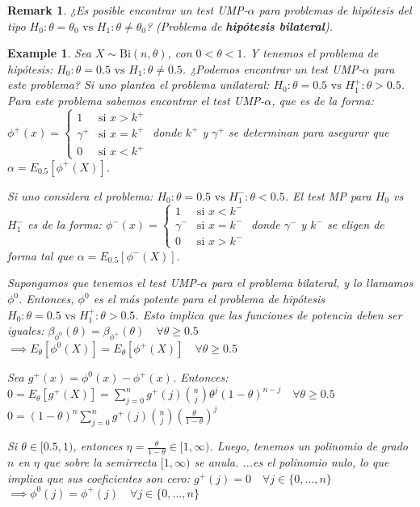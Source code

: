 \documentclass{article}
\theoremstyle{remarkstyle}
\newtheorem*{remark}{Remark}
\theoremstyle{examplestyle}
\newtheorem*{example}{Example}
\theoremstyle{definitionstyle}
\theoremstyle{lemmastyle}
\theoremstyle{theoremstyle}
\begin{document}
\begin{remark}
¿Es posible encontrar un test UMP-$\alpha$ para problemas de hipótesis del tipo $H_0: \theta = \theta_0 \text{ vs } H_1: \theta \neq \theta_0$?
(Problema de \textbf{hipótesis bilateral}).
\end{remark}

\begin{example}
Sea $X \sim \text{Bi}(n, \theta)$, con $0 < \theta < 1$.
Y tenemos el problema de hipótesis:
$H_0: \theta = 0.5 \text{ vs } H_1: \theta \neq 0.5$.
¿Podemos encontrar un test UMP-$\alpha$ para este problema?
Si uno plantea el problema unilateral:
$H_0: \theta=0.5 \text{ vs } H_1^+: \theta > 0.5$.
Para este problema sabemos encontrar el test UMP-$\alpha$, que es de la forma:
$\phi^+(x) = \begin{cases} 1 & \text{si } x > k^+ \\ \gamma^+ & \text{si } x = k^+ \\ 0 & \text{si } x < k^+ \end{cases}$
donde $k^+$ y $\gamma^+$ se determinan para asegurar que $\alpha = E_{0.5}[\phi^+(X)]$.

Si uno considera el problema:
$H_0: \theta=0.5 \text{ vs } H_1^-: \theta < 0.5$.
El test MP para $H_0$ vs $H_1^-$ es de la forma:
$\phi^-(x) = \begin{cases} 1 & \text{si } x < k^- \\ \gamma^- & \text{si } x = k^- \\ 0 & \text{si } x > k^- \end{cases}$
donde $\gamma^-$ y $k^-$ se eligen de forma tal que $\alpha = E_{0.5}[\phi^-(X)]$.

Supongamos que tenemos el test UMP-$\alpha$ para el problema bilateral, y lo llamamos $\phi^0$.
Entonces, $\phi^0$ es el más potente para el problema de hipótesis $H_0: \theta=0.5 \text{ vs } H_1^+: \theta > 0.5$.
Esto implica que las funciones de potencia deben ser iguales:
$\beta_{\phi^0}(\theta) = \beta_{\phi^+}(\theta) \quad \forall \theta \ge 0.5$
$\implies E_\theta[\phi^0(X)] = E_\theta[\phi^+(X)] \quad \forall \theta \ge 0.5$

Sea $g^+(x) = \phi^0(x) - \phi^+(x)$. Entonces:
$0 = E_\theta[g^+(X)] = \sum_{j=0}^n g^+(j) \binom{n}{j} \theta^j (1-\theta)^{n-j} \quad \forall \theta \ge 0.5$
$0 = (1-\theta)^n \sum_{j=0}^n g^+(j) \binom{n}{j} \left(\frac{\theta}{1-\theta}\right)^j$

Si $\theta \in [0.5, 1)$, entonces $\eta = \frac{\theta}{1-\theta} \in [1, \infty)$.
Luego, tenemos un polinomio de grado $n$ en $\eta$ que sobre la semirrecta $[1, \infty)$ se anula. 
...es el polinomio nulo, lo que implica que sus coeficientes son cero:
$g^+(j) = 0 \quad \forall j \in \{0, \dots, n\}$
$\implies \phi^0(j) = \phi^+(j) \quad \forall j \in \{0, \dots, n\}$


\end{example}
\end{document}

